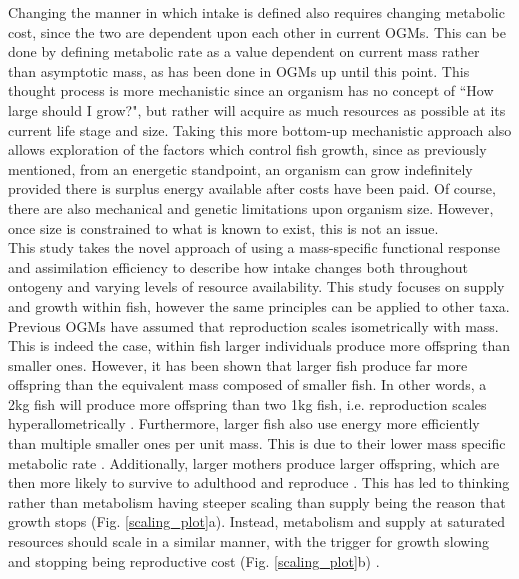 \documentclass[a4paper, 11pt, hidelinks]{article} %
\begin{document}
	Changing the manner in which intake is defined also requires changing metabolic cost, since the two are dependent upon each other in current OGMs.  This can be done by defining metabolic rate as a value dependent on current mass rather than asymptotic mass, as has been done in OGMs up until this point.  This thought process is more mechanistic since an organism has no concept of ``How large should I grow?", but rather will acquire as much resources as possible at its current life stage and size.  Taking this more bottom-up mechanistic approach also allows exploration of the factors which control fish growth, since as previously mentioned, from an energetic standpoint, an organism can grow indefinitely provided there is surplus energy available after costs have been paid.  Of course, there are also mechanical and genetic limitations upon organism size. However, once size is constrained to what is known to exist, this is not an issue.  %
	\\
	This study takes the novel approach of using a mass-specific functional response and assimilation efficiency to describe how intake changes both throughout ontogeny and varying levels of resource availability. This study focuses on supply and growth within fish, however the same principles can be applied to other taxa.
	\\
	Previous OGMs have assumed that reproduction scales isometrically with mass.  This is indeed the case, within fish larger individuals produce more offspring than smaller ones.  %
	However, it has been shown that larger fish produce far more offspring than the equivalent mass composed of smaller fish.  In other words, a 2kg fish will produce more offspring than two 1kg fish, i.e. reproduction scales hyperallometrically \parencite{Barneche2018}.
	Furthermore, larger fish also use energy more efficiently than multiple smaller ones per unit mass.  This is due to their lower mass specific metabolic rate \parencite{Peters1983, Kleiber1932, Brown2004}.  
	Additionally, larger mothers produce larger offspring, which are then more likely to survive to adulthood and reproduce \parencite{Hixon2014, Marshall2006}. 
	This has led to thinking rather than metabolism having steeper scaling than supply being the reason that growth stops (Fig. \ref{scaling_plot}a).  Instead, metabolism and supply at saturated resources should scale in a similar manner, with the trigger for growth slowing and stopping being reproductive cost (Fig. \ref{scaling_plot}b) \parencite{Marshall2019, Sibly2020}. %
\end{document}
